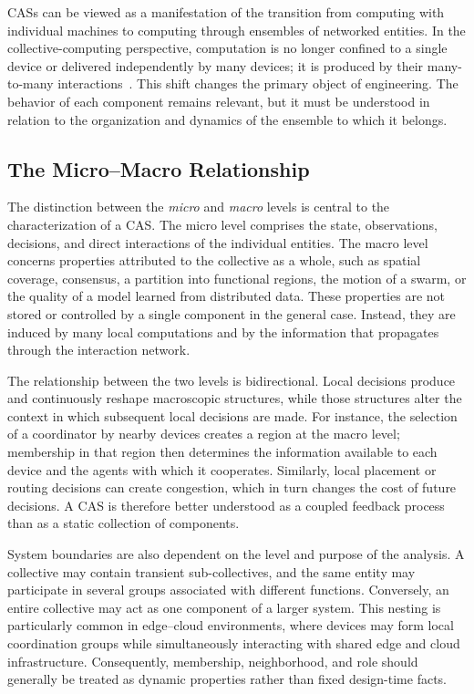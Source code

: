 \glspl{CAS} can be viewed as a manifestation of the transition from computing 
 with individual machines to computing through ensembles of networked entities. 
%
In the collective-computing perspective, 
 computation is no longer confined to a single device or delivered independently by many devices; 
 it is produced by their many-to-many interactions~\cite{DBLP:journals/computer/Abowd}. 
% 
This shift changes the primary object of engineering. 
%
The behavior of each component remains relevant, but it must be understood in relation
 to the organization and dynamics of the ensemble to which it belongs.

\subsection{The Micro--Macro Relationship}
\label{subsec:cas-micro-macro}

The distinction between the \emph{micro} and \emph{macro} levels 
 is central to the characterization of a CAS. 
% 
The micro level comprises the state, observations, decisions, 
 and direct interactions of the individual entities.
%
The macro level concerns properties attributed to the collective as a whole,
 such as spatial coverage, consensus, a partition into functional regions, 
 the motion of a swarm, or the quality of a model learned from distributed data.
%
These properties are not stored or controlled by a single component in the general case. 
%
Instead, 
 they are induced by many local computations 
 and by the information that propagates through the interaction network.

The relationship between the two levels is bidirectional. 
%
Local decisions produce and continuously reshape macroscopic structures, 
 while those structures alter the context in which subsequent local decisions are made.
%
For instance,
 the selection of a coordinator by nearby devices creates a region at the macro level; 
 membership in that region then determines the information available to each device 
 and the agents with which it cooperates. 
% 
Similarly, 
 local placement or routing decisions can create congestion, 
 which in turn changes the cost of future decisions. 
% 
A \gls{CAS} is therefore better understood as a coupled feedback process 
 than as a static collection of components.

System boundaries are also dependent on the level 
 and purpose of the analysis.
%
A collective may contain transient sub-collectives, 
 and the same entity may participate in several groups associated with different functions. 
% 
Conversely,
 an entire collective may act as one component of a larger system. 
% 
This nesting is particularly common in edge--cloud environments, 
 where devices may form local coordination groups while simultaneously interacting with shared edge 
 and cloud infrastructure. 
% 
Consequently, membership, neighborhood, and role should generally be treated 
 as dynamic properties rather than fixed design-time facts.

